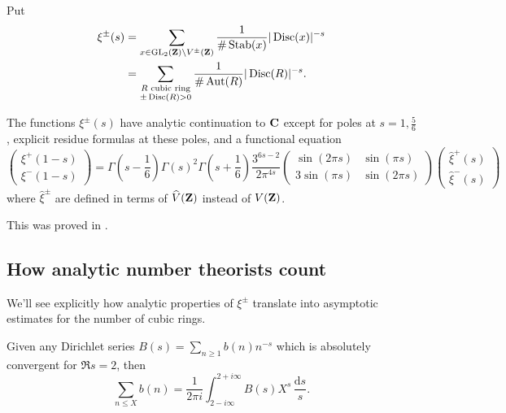 \begin{defi}[Shintani]
Put 
\begin{align*}
  \xi^\pm(s) 
    &= \sum_{x\in \operatorname{GL}_2(\mathbf{Z})\backslash V^\pm(\mathbf{Z})} \frac{1}{\#\operatorname{Stab}(x)}|\operatorname{Disc}(x)|^{-s} \\
    &= \sum_{\substack{R\text{ cubic ring} \\ 
  \pm \operatorname{Disc}(R)>0}} \frac{1}{\#\operatorname{Aut}(R)} |\operatorname{Disc}(R)|^{-s} . 
\end{align*}
\end{defi}

\begin{theo}[Shintani]
The functions $\xi^\pm(s)$ have analytic continuation to $\mathbf{C}$ except for 
poles at $s=1,\frac 5 6$, explicit residue formulas at these poles, and a 
functional equation 
\[
  \begin{pmatrix} \xi^+(1-s) \\ \xi^-(1-s) \end{pmatrix} = \Gamma\left(s-\frac 1 6\right)\Gamma(s)^2 \Gamma\left(s+\frac 1 6\right) \frac{3^{6 s-2}}{2\pi^{4 s}} \begin{pmatrix} \sin(2\pi s) & \sin(\pi s) \\ 3\sin(\pi s) & \sin(2\pi s)\end{pmatrix} \begin{pmatrix} \widehat \xi^+(s) \\ \widehat\xi^-(s) \end{pmatrix} 
\]
where $\widehat\xi^\pm$ are defined in terms of $\widehat V(\mathbf{Z})$ instead of 
$V(\mathbf{Z})$. 
\end{theo}
This was proved in \cite{s72}. 





\subsection{How analytic number theorists count}

We'll see explicitly how analytic properties of $\xi^\pm$ translate into 
asymptotic estimates for the number of cubic rings. 

\begin{principle}
Given any Dirichlet series $B(s)=\sum_{n\geqslant 1} b(n) n^{-s}$ which is 
absolutely convergent for $\Re s=2$, then 
\[
  \sum_{n\leqslant X} b(n) = \frac{1}{2\pi i}\int_{2-i\infty}^{2+i\infty} B(s) X^s \, \frac{\mathrm{d}s}{s} .
\]
\end{principle}


